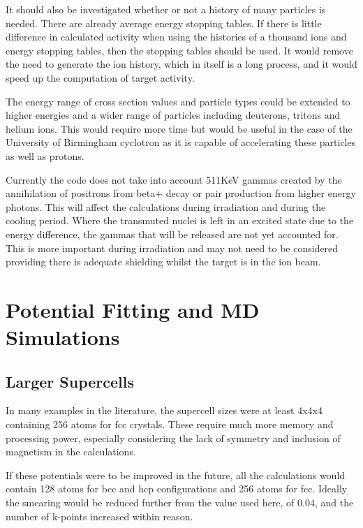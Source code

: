It should also be investigated whether or not a history of many particles is needed.  There are already average energy stopping tables.  If there is little difference in calculated activity when using the histories of a thousand ions and energy stopping tables, then the stopping tables should be used.  It would remove the need to generate the ion history, which in itself is a long process, and it would speed up the computation of target activity.

The energy range of cross section values and particle types could be extended to higher energies and a wider range of particles including deuterons, tritons and helium ions.  This would require more time but would be useful in the case of the University of Birmingham cyclotron as it is capable of accelerating these particles as well as protons.

Currently the code does not take into account 511KeV gammas created by the annihilation of positrons from beta+ decay or pair production from higher energy photons.  This will affect the calculations during irradiation and during the cooling period.  Where the transmuted nuclei is left in an excited state due to the energy difference, the gammas that will be released are not yet accounted for.  This is more important during irradiation and may not need to be considered providing there is adequate shielding whilst the target is in the ion beam.





\section{Potential Fitting and MD Simulations}

\subsection{Larger Supercells}

In many examples in the literature, the supercell sizes were at least 4x4x4 containing 256 atoms for \acrshort{fcc} crystals.  These require much more memory and processing power, especially considering the lack of symmetry and inclusion of magnetism in the calculations.  

If these potentials were to be improved in the future, all the calculations would contain 128 atoms for \acrshort{bcc} and \acrshort{hcp} configurations and 256 atoms for \acrshort{fcc}.  Ideally the smearing would be reduced further from the value used here, of 0.04, and the number of k-points increased within reason.

